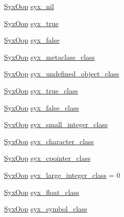 \begin{CompactItemize}
\item 
\hyperlink{syx-types_8h_1121caba2d40b2ce090b640762744ccd}{SyxOop} \hyperlink{syx-object_8c_b1522ab23d05036a843da6f50860c45d}{syx\_\-nil}
\item 
\hyperlink{syx-types_8h_1121caba2d40b2ce090b640762744ccd}{SyxOop} \hyperlink{syx-object_8c_420b624002efae10b26b6ae50e4a2676}{syx\_\-true}
\item 
\hyperlink{syx-types_8h_1121caba2d40b2ce090b640762744ccd}{SyxOop} \hyperlink{syx-object_8c_f40bef822ab93070372bb305d0443bd5}{syx\_\-false}
\item 
\hyperlink{syx-types_8h_1121caba2d40b2ce090b640762744ccd}{SyxOop} \hyperlink{syx-object_8c_0cf8d3871a460f97d82abf627a613fb0}{syx\_\-metaclass\_\-class}
\item 
\hyperlink{syx-types_8h_1121caba2d40b2ce090b640762744ccd}{SyxOop} \hyperlink{syx-object_8c_fdf28614ea5338b2445fd47c330f2b83}{syx\_\-undefined\_\-object\_\-class}
\item 
\hyperlink{syx-types_8h_1121caba2d40b2ce090b640762744ccd}{SyxOop} \hyperlink{syx-object_8c_d4717a5b0d7434075eafe75b61a25c1a}{syx\_\-true\_\-class}
\item 
\hyperlink{syx-types_8h_1121caba2d40b2ce090b640762744ccd}{SyxOop} \hyperlink{syx-object_8c_e5d45ff06a0c2cad939d22b799778717}{syx\_\-false\_\-class}
\item 
\hyperlink{syx-types_8h_1121caba2d40b2ce090b640762744ccd}{SyxOop} \hyperlink{syx-object_8c_8b85a92f613df230370e74484940158c}{syx\_\-small\_\-integer\_\-class}
\item 
\hyperlink{syx-types_8h_1121caba2d40b2ce090b640762744ccd}{SyxOop} \hyperlink{syx-object_8c_be9354d970faef793af7e85246dd2ef8}{syx\_\-character\_\-class}
\item 
\hyperlink{syx-types_8h_1121caba2d40b2ce090b640762744ccd}{SyxOop} \hyperlink{syx-object_8c_8cad5bfec024ce53ab7561d648810e64}{syx\_\-cpointer\_\-class}
\item 
\hyperlink{syx-types_8h_1121caba2d40b2ce090b640762744ccd}{SyxOop} \hyperlink{syx-object_8c_bc3a56814685116879a64cc0176b9e65}{syx\_\-large\_\-integer\_\-class} = 0
\item 
\hyperlink{syx-types_8h_1121caba2d40b2ce090b640762744ccd}{SyxOop} \hyperlink{syx-object_8c_268191e05e6cedc5d62bd5b895293932}{syx\_\-float\_\-class}
\item 
\hyperlink{syx-types_8h_1121caba2d40b2ce090b640762744ccd}{SyxOop} \hyperlink{syx-object_8c_1848105ff104416a12408af2205143e9}{syx\_\-symbol\_\-class}

\end{CompactItemize}
